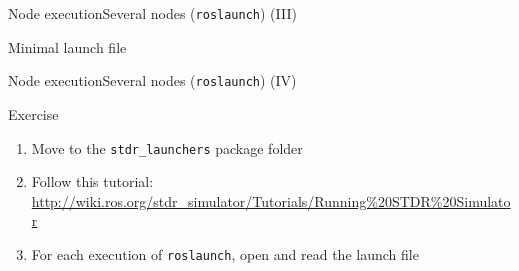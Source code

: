 \documentclass[10pt,compress]{beamer} %
\begin{document}
\begin{frame}{Node execution}{Several nodes (\texttt{roslaunch}) (III)}
	\vspace{-0.2cm}
    \begin{exampleblock}{Minimal launch file}
		\vspace{-0.2cm}
	    
		\vspace{-0.2cm}
    \end{exampleblock}
\end{frame}

\begin{frame}{Node execution}{Several nodes (\texttt{roslaunch}) (IV)}
	\begin{block}{Exercise}
	\begin{enumerate}
		\item Move to the \texttt{stdr\_launchers} package folder
		\item Follow this tutorial: \url{http://wiki.ros.org/stdr\_simulator/Tutorials/Running\%20STDR\%20Simulator}
		\item For each execution of \texttt{roslaunch}, open and read the launch file
	\end{enumerate}
	\end{block}
\end{frame}
\end{document}
